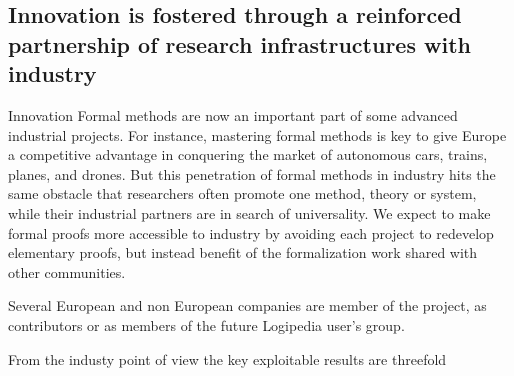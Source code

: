 \subsection{Innovation is fostered through a reinforced partnership of research
infrastructures with industry}

Innovation Formal methods are now an important part of some advanced
industrial projects. For instance, mastering formal methods is key to
give Europe a competitive advantage in conquering the market of
autonomous cars, trains, planes, and drones. But this penetration of
formal methods in industry hits the same obstacle that researchers
often promote one method, theory or system, while their industrial
partners are in search of universality. We expect to make formal
proofs more accessible to industry by avoiding each project to
redevelop elementary proofs, but instead benefit of the formalization
work shared with other communities.

Several European and non European companies are member of the project,
as contributors or as members of the future {\sc Logipedia} user's group.

From the industy point of view the key exploitable results are threefold

